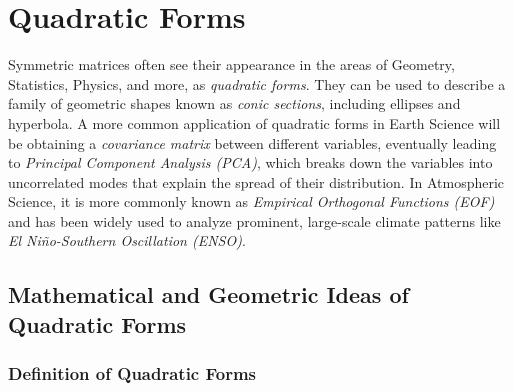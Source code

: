 \chapter{Quadratic Forms}
\label{chap:quad}

Symmetric matrices often see their appearance in the areas of Geometry, Statistics, Physics, and more, as \textit{quadratic forms}. They can be used to describe a family of geometric shapes known as \textit{conic sections}, including ellipses and hyperbola. A more common application of quadratic forms in Earth Science will be obtaining a \textit{covariance matrix} between different variables, eventually leading to \textit{Principal Component Analysis (PCA)}, which breaks down the variables into uncorrelated modes that explain the spread of their distribution. In Atmospheric Science, it is more commonly known as \textit{Empirical Orthogonal Functions (EOF)} and has been widely used to analyze prominent, large-scale climate patterns like \textit{El Niño-Southern Oscillation (ENSO)}. 

\section{Mathematical and Geometric Ideas of Quadratic Forms}
\subsection{Definition of Quadratic Forms}

